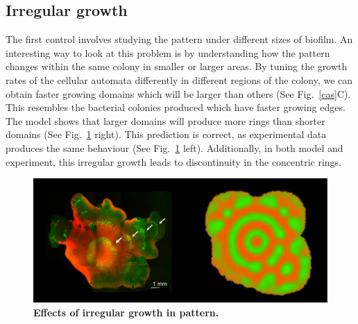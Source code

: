 \subsection{Irregular growth}
The first control involves studying the pattern under different sizes of biofilm.
An interesting way to look at this problem is by understanding how the pattern changes within the same colony in smaller or larger areas.
By tuning the growth rates of the cellular automata differently in different regions of the colony, we can obtain faster growing domains which will be larger than others (See Fig.~\ref{cas}C).
This resembles the bacterial colonies produced which have faster growing edges.
The model shows that larger domains will produce more rings than shorter domains (See Fig.~\ref{fig:irregular growth} right).
This prediction is correct, as experimental data produces the same behaviour  (See Fig.~\ref{fig:irregular growth} left).
Additionally, in both model and experiment, this irregular growth leads to discontinuity in the concentric rings.
\begin{figure}[H] %
    \centering
    \begin{adjustbox}{center}
        \includegraphics[width=1\textwidth]{chapters/Chapter 3/irregular growth} %
    \end{adjustbox}
    \caption{\textbf{Effects of irregular growth in pattern.} }
    \label{fig:irregular growth}
\end{figure}


